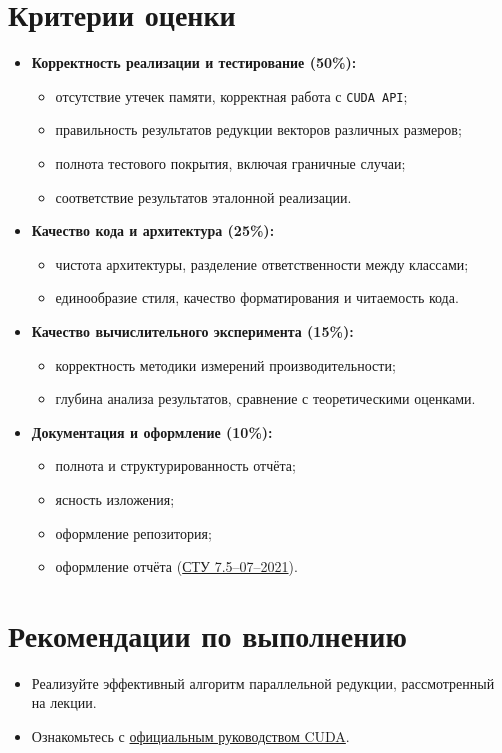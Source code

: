 \documentclass[12pt]{article}
\begin{document}
\section*{Критерии оценки}
\begin{itemize}
    \item \textbf{Корректность реализации и тестирование (50\%):}
    \begin{itemize}
        \item отсутствие утечек памяти, корректная работа с \texttt{CUDA API};
        \item правильность результатов редукции векторов различных размеров;
        \item полнота тестового покрытия, включая граничные случаи;
        \item соответствие результатов эталонной реализации.
    \end{itemize}

    \item \textbf{Качество кода и архитектура (25\%):}
    \begin{itemize}
        \item чистота архитектуры, разделение ответственности между классами;
        \item единообразие стиля, качество форматирования и читаемость кода.
    \end{itemize}

    \item \textbf{Качество вычислительного эксперимента (15\%):}
    \begin{itemize}
        \item корректность методики измерений производительности;
        \item глубина анализа результатов, сравнение с теоретическими оценками.
    \end{itemize}

    \item \textbf{Документация и оформление (10\%):}
    \begin{itemize}
        \item полнота и структурированность отчёта;
        \item ясность изложения;
        \item оформление репозитория;
        \item оформление отчёта (\href{https://sfu.ru/sapi/file-upload/325396c75b669b84763c10b7b5c73ec1.pdf}{СТУ 7.5–07–2021}).
    \end{itemize}
\end{itemize}

\section*{Рекомендации по выполнению}
\begin{itemize}
    \item Реализуйте эффективный алгоритм параллельной редукции, рассмотренный на лекции.
    \item Ознакомьтесь с \href{https://docs.nvidia.com/cuda/cuda-c-programming-guide/#warp-shuffle-functions}{официальным руководством CUDA}.
\end{itemize}
\end{document}
